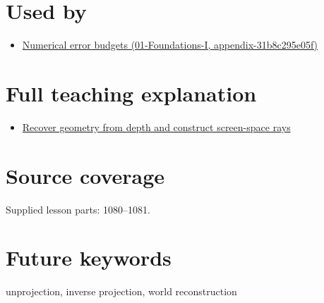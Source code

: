 \section{Used by}\label{appendix-2cbf2968e866-used-by}

\begin{itemize}
\tightlist
\item
  \href{../01-Foundations-I/main.pdf\#nameddest=appendix-31b8c295e05f}{Numerical error budgets (01-Foundations-I, appendix-31b8c295e05f)}
\end{itemize}

\section{Full teaching explanation}\label{appendix-2cbf2968e866-full-teaching-explanation}

\begin{itemize}
\tightlist
\item
  \href{Continuous\%20Notes/Computing\%20Foundations\%20-\%20From\%20Bits\%20to\%20C++\%20and\%20Systems\%20APIs\#Recover\%20geometry\%20from\%20depth\%20and\%20construct\%20screen-space\%20rays}{Recover geometry from depth and construct screen-space rays}
\end{itemize}

\section{Source coverage}\label{appendix-2cbf2968e866-source-coverage}

Supplied lesson parts: 1080--1081.

\section{Future keywords}\label{appendix-2cbf2968e866-future-keywords}

unprojection, inverse projection, world reconstruction
